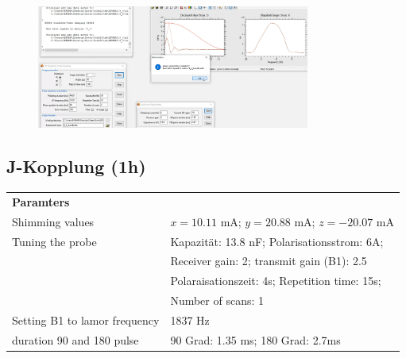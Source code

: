 \begin{figure}[H]
    \centering
    \includegraphics[width = 0.8\textwidth]{Screenshot2/9_4_bandbreite.jpg}
\end{figure}


\subsection{J-Kopplung (1h)}


    \begin{tabular}{ll}

        \textbf{Paramters} &            \\
        
        Shimming values & $x = 10.11$ mA; $y = 20.88$ mA; $z = −20.07$ mA \\
        
        Tuning the probe & Kapazität: 13.8 nF; Polarisationsstrom: 6A;\\
        & Receiver gain: 2; transmit gain (B1): 2.5\\
        & Polaraisationszeit: 4s; Repetition time: 15s; \\
        & Number of scans: 1\\
        
        Setting B1 to lamor frequency &    1837 Hz \\
        
        duration 90 and 180 pulse & 90 Grad: 1.35 ms; 180 Grad: 2.7ms \\
    \end{tabular} 

